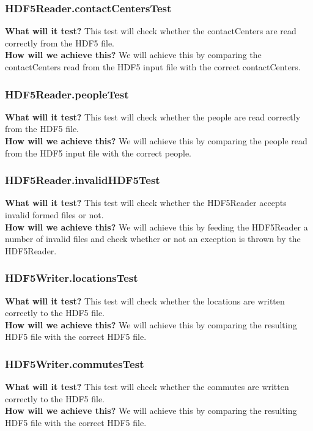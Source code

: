 \documentclass{article}
\begin{document}
\subsubsection{HDF5Reader.contactCentersTest}
\textbf{What will it test?}
This test will check whether the contactCenters are read correctly from the HDF5 file. \\
\newline
\textbf{How will we achieve this?}
We will achieve this by comparing the contactCenters read from the HDF5 input file with the correct contactCenters.

\subsubsection{HDF5Reader.peopleTest}
\textbf{What will it test?}
This test will check whether the people are read correctly from the HDF5 file. \\
\newline
\textbf{How will we achieve this?}
We will achieve this by comparing the people read from the HDF5 input file with the correct people.

\subsubsection{HDF5Reader.invalidHDF5Test}
\textbf{What will it test?}
This test will check whether the HDF5Reader accepts invalid formed files or not. \\
\newline
\textbf{How will we achieve this?}
We will achieve this by feeding the HDF5Reader a number of invalid files and check whether or not an exception is thrown by the HDF5Reader.

\subsubsection{HDF5Writer.locationsTest}
\textbf{What will it test?}
This test will check whether the locations are written correctly to the HDF5 file. \\
\newline
\textbf{How will we achieve this?}
We will achieve this by comparing the resulting HDF5 file with the correct HDF5 file.

\subsubsection{HDF5Writer.commutesTest}
\textbf{What will it test?}
This test will check whether the commutes are written correctly to the HDF5 file. \\
\newline 
\textbf{How will we achieve this?}
We will achieve this by comparing the resulting HDF5 file with the correct HDF5 file.
\end{document}
